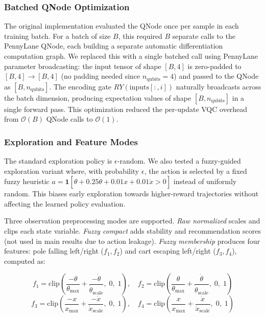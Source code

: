\subsubsection*{Batched QNode Optimization}

The original implementation evaluated the QNode once per sample in each
training batch. For a batch of size $B$, this required $B$ separate calls to the
PennyLane QNode, each building a separate automatic differentiation
computation graph. We replaced this with a single batched call using PennyLane
parameter broadcasting: the input tensor of shape $[B, 4]$ is zero-padded to
$[B, 4] \rightarrow [B, 4]$ (no padding needed since $n_{\text{qubits}} = 4$)
and passed to the QNode as $[B, n_{\text{qubits}}]$. The encoding gate
$RY(\text{inputs}[:, i])$ naturally broadcasts across the batch dimension,
producing expectation values of shape $[B, n_{\text{qubits}}]$ in a single
forward pass. This optimization reduced the per-update VQC overhead from
$\mathcal{O}(B)$ QNode calls to $\mathcal{O}(1)$.

\subsubsection*{Exploration and Feature Modes}

The standard exploration policy is $\epsilon$-random. We also tested a
fuzzy-guided exploration variant where, with probability $\epsilon$, the action
is selected by a fixed fuzzy heuristic $a = \mathbf{1}[\theta + 0.25\dot{\theta}
+ 0.01x + 0.01\dot{x} > 0]$ instead of uniformly random. This biases early
exploration towards higher-reward trajectories without affecting the learned
policy evaluation.

Three observation preprocessing modes are supported. \emph{Raw normalized}
scales and clips each state variable. \emph{Fuzzy compact} adds stability and
recommendation scores (not used in main results due to action leakage).
\emph{Fuzzy membership} produces four features: pole falling left/right ($f_1,
f_2$) and cart escaping left/right ($f_3, f_4$), computed as:

\begin{equation}
f_1 = \text{clip}\!\left(\frac{-\theta}{\theta_{\max}} +
\frac{-\dot{\theta}}{\dot{\theta}_{\text{scale}}},\; 0,\; 1\right), \quad
f_2 = \text{clip}\!\left(\frac{\theta}{\theta_{\max}} +
\frac{\dot{\theta}}{\dot{\theta}_{\text{scale}}},\; 0,\; 1\right)
\end{equation}
\begin{equation}
f_3 = \text{clip}\!\left(\frac{-x}{x_{\max}} +
\frac{-\dot{x}}{\dot{x}_{\text{scale}}},\; 0,\; 1\right), \quad
f_4 = \text{clip}\!\left(\frac{x}{x_{\max}} +
\frac{\dot{x}}{\dot{x}_{\text{scale}}},\; 0,\; 1\right)
\end{equation}

